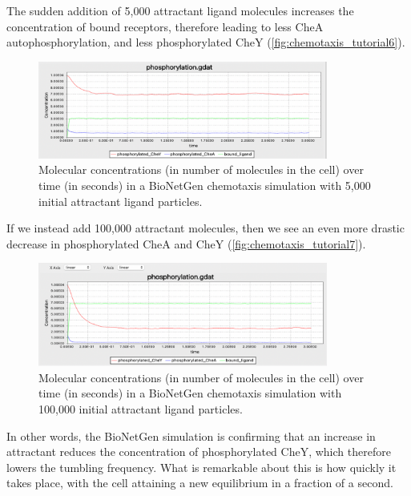 The sudden addition of 5,000 attractant ligand molecules increases the concentration of bound receptors, therefore leading to less CheA autophosphorylation, and less phosphorylated CheY (\autoref{fig:chemotaxis_tutorial6}).\\

\begin{figure}[h]
\centering
\mySfFamily
\includegraphics[width = 0.85\textwidth]{../images/chemotaxis_tutorial6.png}
\caption{Molecular concentrations (in number of molecules in the cell) over time (in seconds) in a BioNetGen chemotaxis simulation with 5,000 initial attractant ligand particles.}
\label{fig:chemotaxis_tutorial6}
\end{figure}

If we instead add 100,000 attractant molecules, then we see an even more drastic decrease in phosphorylated CheA and CheY (\autoref{fig:chemotaxis_tutorial7}).

\begin{figure}[h]
\centering
\mySfFamily
\includegraphics[width = 0.85\textwidth]{../images/chemotaxis_tutorial7.png}
\caption{Molecular concentrations (in number of molecules in the cell) over time (in seconds) in a BioNetGen chemotaxis simulation with 100,000 initial attractant ligand particles.}
\label{fig:chemotaxis_tutorial7}
\end{figure}


In other words, the BioNetGen simulation is confirming that an increase in attractant reduces the concentration of phosphorylated CheY, which therefore lowers the tumbling frequency. What is remarkable about this is how quickly it takes place, with the cell attaining a new equilibrium in a fraction of a second.


